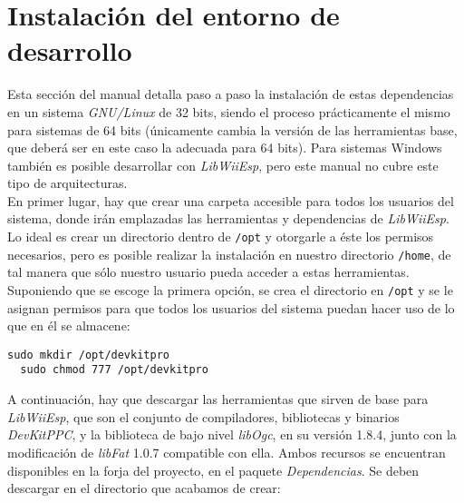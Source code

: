 



\section{Instalación del entorno de desarrollo}

Esta sección del manual detalla paso a paso la instalación de estas dependencias en un sistema \emph{GNU/Linux} de 32 bits, siendo el proceso prácticamente el mismo para sistemas de 64 bits (únicamente cambia la versión de las herramientas base, que deberá ser en este caso la adecuada para 64 bits). Para sistemas Windows también es posible desarrollar con \emph{LibWiiEsp}, pero este manual no cubre este tipo de arquitecturas. \\

En primer lugar, hay que crear una carpeta accesible para todos los usuarios del sistema, donde irán emplazadas las herramientas y dependencias de \emph{LibWiiEsp}. Lo ideal es crear un directorio dentro de \texttt{/opt} y otorgarle a éste los permisos necesarios, pero es posible realizar la instalación en nuestro directorio \texttt{/home}, de tal manera que sólo nuestro usuario pueda acceder a estas herramientas. \\

Suponiendo que se escoge la primera opción, se crea el directorio en \texttt{/opt} y se le asignan permisos para que todos los usuarios del sistema puedan hacer uso de lo que en él se almacene:

\begin{lstlisting}[style=consola]
  sudo mkdir /opt/devkitpro
  sudo chmod 777 /opt/devkitpro
\end{lstlisting}

A continuación, hay que descargar las herramientas que sirven de base para \emph{LibWiiEsp}, que son el conjunto de compiladores, bibliotecas y binarios \emph{DevKitPPC}, y la biblioteca de bajo nivel \emph{libOgc}, en su versión 1.8.4, junto con la modificación de \emph{libFat} 1.0.7 compatible con ella. Ambos recursos se encuentran disponibles en la forja del proyecto, en el paquete \emph{Dependencias}. Se deben descargar en el directorio que acabamos de crear:

